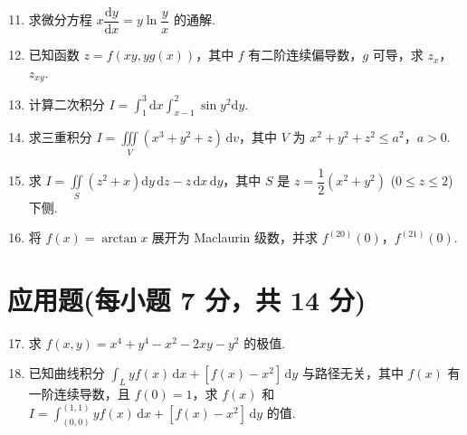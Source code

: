 \documentclass[../main.tex]{subfiles}
\begin{document}
\begin{enumerate}
    \setcounter{enumi}{10}
    \item 求微分方程 \( x \dfrac{\mathrm{d}y}{\mathrm{d}x} = y \ln \dfrac{y}{x} \) 的通解.
          \vspace{10em}

    \item 已知函数 \( z = f(xy, yg(x)) \)，其中 \( f \) 有二阶连续偏导数，\( g \) 可导，求 \( z_x \)，\( z_{xy} \).
          \vspace{10em}

    \item 计算二次积分 \( I = \displaystyle \int_1^3 \mathrm{d}x \displaystyle \int_{x-1}^2 \sin y^2 \mathrm{d}y \).
          \vspace{12em}

    \item 求三重积分 \( I = \displaystyle \iiint \limits_V (x^3 + y^2 + z) \,\mathrm{d}v \)，其中 \( V \) 为 \( x^2 + y^2 + z^2 \leq a^2 \)，\( a > 0 \).
          \vspace{12em}

    \item 求 \( I = \displaystyle \iint \limits_S (z^2 + x) \mathrm{d}y\,\mathrm{d}z - z\,\mathrm{d}x\,\mathrm{d}y \)，其中 \( S \) 是 \( z = \dfrac{1}{2}(x^2 + y^2) \) (\( 0 \leq z \leq 2 \)) 下侧.
          \vspace{12em}

    \item 将 \( f(x) = \arctan x \) 展开为 Maclaurin 级数，并求 \( f^{(20)}(0) \)，\( f^{(21)}(0) \).
          \vspace{12em}
\end{enumerate}

\section{应用题(每小题 7 分，共 14 分)}

\begin{enumerate}
    \setcounter{enumi}{16}
    \item 求 \( f(x, y) = x^4 + y^4 - x^2 - 2xy - y^2 \) 的极值.
          \vspace{10em}

    \item 已知曲线积分 \( \displaystyle \int_L y f(x) \,\mathrm{d}x + \left[f(x) - x^2\right] \,\mathrm{d}y \) 与路径无关，其中 \( f(x) \) 有一阶连续导数，且 \( f(0) = 1 \)，求 \( f(x) \) 和 \( I = \displaystyle \int_{(0,0)}^{(1,1)} y f(x) \,\mathrm{d}x + [f(x) - x^2] \,\mathrm{d}y \) 的值.
          \vspace{10em}
\end{enumerate}
\end{document}

